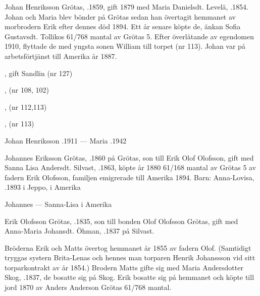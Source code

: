 Johan Henriksson Grötas, .1859, gift 1879 med Maria Danielsdt. Levelä, .1854. Johan och Maria blev bönder på Grötas sedan han övertagit hemmanet av morbrodern Erik efter dennes död 1894. Ett år senare köpte de, änkan Sofia Gustavsdt. Tollikos 61/768 mantal av Grötas 5.  Efter överlåtande av egendomen 1910, flyttade de med yngsta sonen William till torpet (nr 113). Johan var på arbetsförtjänst till Amerika år 1887.
\begin{jhchildren}
  \item {}, gift Sandlin (nr 127)
  \item {}, (nr 108, 102)
  \item {}, (nr 112,113)
  \item {}
  \item {}, (nr 113)
\end{jhchildren}

Johan Henriksson .1911  ---  Maria .1942


Johannes Eriksson Grötas, .1860 på Grötas, son till Erik Olof Olofsson, gift med Sanna Lisa Andersdt. Silvast, .1863, köpte år 1880 61/168 mantal av Grötas 5 av fadern Erik Olofsson,  familjen emigrerade till Amerika 1894.
Barn: Anna-Lovisa, .1893 i Jeppo,  i Amerika

Johannes   ---  Sanna-Lisa  i Amerika


Erik Olofsson Grötas, .1835, son till bonden Olof Olofsson Grötas, gift med Anna-Maria Johansdt. Öhman, .1837 på Silvast.

Bröderna Erik och Matts övertog hemmanet år 1855 av fadern Olof. (Samtidigt tryggas systern Brita-Lenas och hennes man torparen Henrik Johanssson vid sitt torparkontrakt av år 1854.) Brodern Matts gifte sig med Maria Andersdotter Skog, .1837, de bosatte sig på Skog. Erik bosatte sig på hemmanet och köpte till jord 1870 av Anders Anderson Grötas 61/768 mantal.

